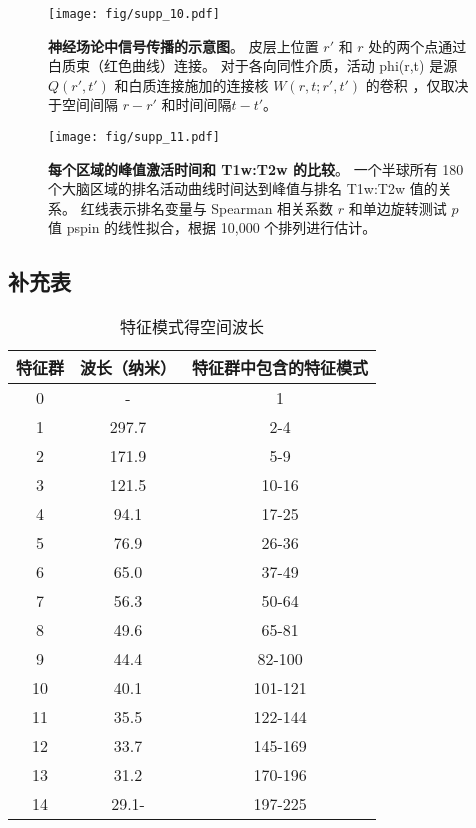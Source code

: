 \documentclass[lang=cn,a4paper,newtx]{elegantpaper}
\begin{document}
\begin{figure}[!htb] 
	\centering
	\texttt{[image: fig/supp\_10.pdf]}
	\caption{\textbf{神经场论中信号传播的示意图}。
		皮层上位置 $ r' $ 和 $ r $ 处的两个点通过白质束（红色曲线）连接。 对于各向同性介质，活动 phi(r,t) 是源 $ Q(r',t') $ 和白质连接施加的连接核 $ W(r,t;r',t') $ 的卷积 ，仅取决于空间间隔 $ r-r' $ 和时间间隔$  t-t' $。
	} \label{fig:supp_10}
\end{figure}


\begin{figure}[!htb] 
	\centering
	\texttt{[image: fig/supp\_11.pdf]}
	\caption{
		\textbf{每个区域的峰值激活时间和 T1w:T2w 的比较}。
		一个半球所有 180 个大脑区域的排名活动曲线时间达到峰值与排名 T1w:T2w 值的关系。
		红线表示排名变量与 Spearman 相关系数 $ r $ 和单边旋转测试 $ p $ 值 pspin 的线性拟合，根据 10,000 个排列进行估计。
	} \label{fig:supp_11}
\end{figure}



\subsection{补充表}

\begin{table}[htbp]
	\centering
	\small
	\caption{特征模式得空间波长}
	\begin{tabular}{ccc}
		\toprule
		特征群         &        波长（纳米）  & 特征群中包含的特征模式     \\
		\midrule
		0      &   -      &      1  \\
		1      &   297.7      &      2-4  \\
		2      &   171.9      &      5-9  \\
		3      &   121.5      &      10-16  \\
		4      &   94.1      &      17-25  \\
		5      &   76.9      &      26-36  \\
		6      &   65.0      &      37-49  \\
		7      &   56.3      &      50-64  \\
		8      &   49.6      &      65-81  \\
		9      &   44.4      &      82-100  \\
		10      &   40.1      &      101-121  \\
		11      &   35.5      &      122-144  \\
		12      &   33.7      &      145-169  \\
		13      &   31.2      &      170-196  \\
		14      &   29.1-      &      197-225  \\

		\bottomrule
	\end{tabular}%
	\label{tab:spatial_wavelength}%
\end{table}%
\end{document}
